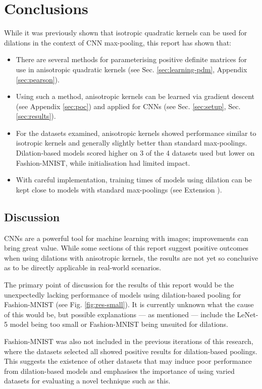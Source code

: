 \documentclass[a4paper, 12pt]{report}
\begin{document}
\chapter{Conclusions}
\vspace{-1cm}
While it was previously shown that isotropic quadratic kernels can be used for dilations in the context of CNN max-pooling, this report has shown that:
\begin{itemize}
\setlength{\itemsep}{0pt}
	\item There are several methods for parameterising positive definite matrices for use in anisotropic quadratic kernels (see Sec. \ref{sec:learning-pdm}, Appendix \ref{sec:pearson}).
	\item Using such a method, anisotropic kernels can be learned via gradient descent (see Appendix \ref{sec:poc}) and applied for CNNs (see Sec. \ref{sec:setup}, Sec. \ref{sec:results}).
	\item For the datasets examined, anisotropic kernels showed performance similar to isotropic kernels and generally slightly better than standard max-poolings. Dilation-based models scored higher on 3 of the 4 datasets used but lower on Fashion-MNIST, while initialisation had limited impact.
	\item With careful implementation, training times of models using dilation can be kept close to models with standard max-poolings (see Extension \cite{extension}).
\end{itemize}
\vspace{-0.5cm}
\section{Discussion}
\label{sec:discussion}
CNNs are a powerful tool for machine learning with images; improvements can bring great value. While some sections of this report suggest positive outcomes when using dilations with anisotropic kernels, the results are not yet so conclusive as to be directly applicable in real-world scenarios.

The primary point of discussion for the results of this report would be the unexpectedly lacking performance of models using dilation-based pooling for Fashion-MNIST (see Fig. \ref{fig:res-small}). It is currently unknown what the cause of this would be, but possible explanations --- as mentioned --- include the LeNet-5 model being too small or Fashion-MNIST being unsuited for dilations.

Fashion-MNIST was also not included in the previous iterations of this research, where the datasets selected all showed positive results for dilation-based poolings. This suggests the existence of other datasets that may induce poor performance from dilation-based models and emphasises the importance of using varied datasets for evaluating a novel technique such as this.
\end{document}
